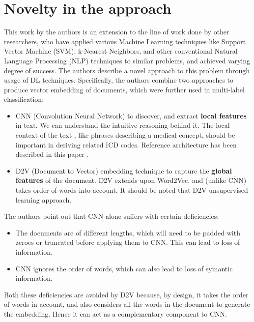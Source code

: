 \documentclass[11pt,a4paper]{article}
\begin{document}
\section{Novelty in the approach}

This work by the authors is an extension to the line of work done by other researchers, who have applied various Machine Learning techniques like Support Vector Machine (SVM), k-Nearest Neighbors, and other conventional Natural Language Processing (NLP) techniques to similar problems, and achieved varying degree of success.
The authors describe a novel approach to this problem through usage of DL techniques. Specifically, the authors combine two approaches to produce vector embedding of documents, which were further used in multi-label classification:
\begin{itemize}
    \item CNN (Convolution Neural Network) to discover, and extract \textbf{local features} in text. We can understand the intuitive reasoning behind it. The local context of the text , like phrases describing a medical concept, should be important in deriving related ICD codes. Reference architecture has been described in this paper \cite{kim2014convolutional}.
    \item D2V (Document to Vector) \cite{le2014distributed} embedding technique to capture the \textbf{global features} of the document. D2V extends upon Word2Vec, and (unlike CNN) takes order of words into account. It should be noted that D2V unsupervised learning approach.
\end{itemize}
The authors point out that CNN alone suffers with certain deficiencies:
\begin{itemize}
	\item The documents are of different lengths, which will need to be padded with zeroes or truncated before applying them to CNN. This can lead to loss of information.
	\item CNN ignores the order of words, which can also lead to loss of symantic information.
\end{itemize}
Both these deficiencies are avoided by D2V because, by design, it takes the order of words in account, and also considers all the words in the document to generate the embedding. Hence it can act as a complementary component to CNN.
\end{document}
